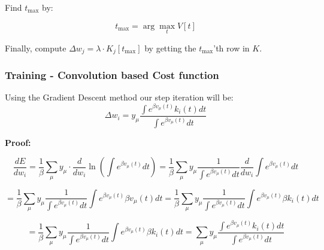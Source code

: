 Find $t_{\text{max}}$ by: 

\begin{equation}
    t_{\text{max}} = \arg\max_t V[t]
\end{equation}

Finally, compute $\Delta w_j = \lambda \cdot K_j[t_{\text{max}}]$ by getting the $t_{\text{max}}$'th row in $K$.

\subsubsection{Training - Convolution based Cost function}


\begin{mdframed}[backgroundcolor=red_background, linecolor=black, linewidth=2pt, frametitle=\textbf{Statement}]
\begin{center}

    \label{st:GD-convl-medel}
    Using the Gradient Descent method our step iteration will be:
    \begin{equation}
        \Delta w_i = y_{\mu}\frac{\int e^{\beta v_{\mu}(t)} k_i(t) dt}{\int e^{\beta v_{\mu}(t)} dt}
    \end{equation}

\end{center}
\end{mdframed}

\textbf{Proof:}

\begin{equation}
\frac{dE}{dw_i} = \frac{1}{\beta}\sum_{\mu}{y_{\mu} \cdot 
\frac{d}{dw_i}\ln\left(\int e^{\beta v_{\mu}(t)} dt\right)} = \frac{1}{\beta}\sum_{\mu}{y_{\mu}\frac{1}{\int e^{\beta v_{\mu}(t)} dt}\frac{d}{dw_i}\int e^{\beta v_{\mu}(t)} dt}
\end{equation}

\begin{equation}
= \frac{1}{\beta}\sum_{\mu}{y_{\mu}\frac{1}{\int e^{\beta v_{\mu}(t)} dt}\int e^{\beta v_{\mu}(t)} \beta v_{\mu}(t) dt} = \frac{1}{\beta}\sum_{\mu}{y_{\mu}\frac{1}{\int e^{\beta v_{\mu}(t)} dt}\int e^{\beta v_{\mu}(t)} \beta k_i(t) dt}
\end{equation}

\begin{equation}
= \frac{1}{\beta}\sum_{\mu}{y_{\mu}\frac{1}{\int e^{\beta v_{\mu}(t)} dt}\int e^{\beta v_{\mu}(t)} \beta k_i(t) dt} = \sum_{\mu}{y_{\mu}\frac{\int e^{\beta v_{\mu}(t)} k_i(t) dt}{\int e^{\beta v_{\mu}(t)} dt}}
\end{equation}

